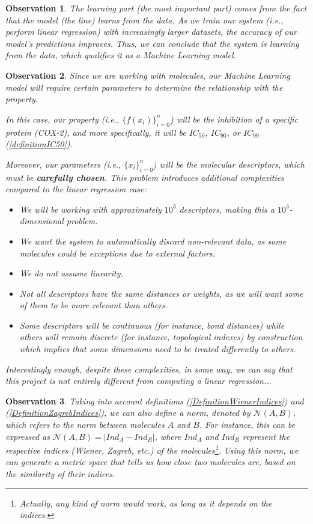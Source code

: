 \documentclass[12pt,letterpaper]{article}
\newtheorem{observation}{Observation}
\begin{document}
\begin{multicols}{2}
\begin{observation}
The \emph{learning} part (the most important part) comes from the fact that the model (the line) learns from the data. As we train our system (i.e., perform linear regression) with increasingly larger datasets, the accuracy of our model's predictions improves. Thus, we can conclude that the system is \emph{learning} from the data, which qualifies it as a Machine Learning model.\par
\end{observation}
\begin{observation}
Since we are working with molecules, our Machine Learning model will require certain parameters to determine the relationship with the property.\par
In this case, our \emph{property} (i.e., $\{f(x_i)\}_{i=0}^n$) will be the inhibition of a specific protein (COX-2), and more specifically, it will be $IC_{50}$, $IC_{90}$, or $IC_{99}$ (\ref{definitionIC50}).\par
Moreover, our \emph{parameters} (i.e., $\{x_i\}_{i=0}^n$) will be the molecular descriptors, which must be \textbf{carefully chosen}. This problem introduces additional complexities compared to the linear regression case:
\begin{itemize}
    \item We will be working with approximately $10^3$ descriptors, making this a $10^3$-dimensional problem.
    \item We want the system to automatically discard non-relevant data, as some molecules could be exceptions due to external factors.
    \item We do not assume linearity.
    \item Not all descriptors have the same distances or weights, as we will want some of them to be more relevant than others.
    \item Some descriptors will be continuous (for instance, bond distances) while others will remain discrete (for instance, topological indexes) by construction  which implies that some dimensions need to be treated differently to others.
\end{itemize}
Interestingly enough, despite these complexities, in some way, we can say that this project is not entirely different from computing a linear regression...
\end{observation}
\begin{observation}
Taking into account definitions (\ref{DefinitionWienerIndices}) and (\ref{DefinitionZagrebIndices}), we can also define a norm, denoted by $\mathcal{N}(A,B)$, which refers to the norm between molecules $A$ and $B$. For instance, this can be expressed as $\mathcal{N}(A,B) = |Ind_A - Ind_B|$, where $Ind_A$ and $Ind_B$ represent the respective indices (Wiener, Zagreb, etc.) of the molecules\footnote{Actually, any kind of norm would work, as long as it depends on the indices.}. Using this norm, we can generate a metric space that tells us how close two molecules are, based on the similarity of their indices.


\end{observation}
\end{multicols}
\end{document}
